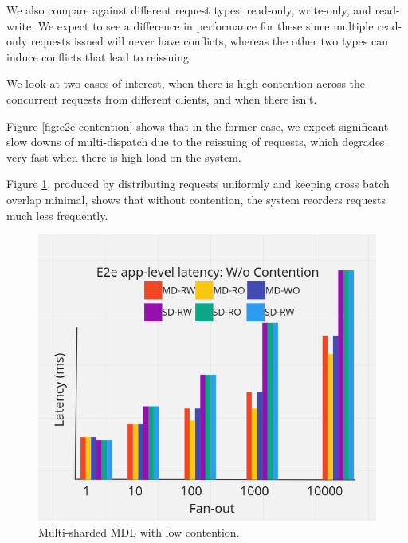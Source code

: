 We also compare against different request types: read-only, write-only, and read-write. We expect to see a difference in performance for these since multiple read-only requests issued will never have conflicts, whereas the other two types can induce conflicts that lead to reissuing.

We look at two cases of interest, when there is high contention across the concurrent requests from different clients, and when there isn't. 

Figure \ref{fig:e2e-contention} shows that in the former case, we expect significant slow downs of multi-dispatch due to the reissuing of requests, which degrades very fast when there is high load on the system.

Figure \ref{fig:e2e-nocontention}, produced by distributing requests uniformly and keeping cross batch overlap minimal, shows that without contention, the system reorders requests much less frequently.
\begin{figure}[!htb]
\includegraphics[scale=.32]{e2e-wo-contention.png}
\caption{Multi-sharded MDL with low contention.}
\label{fig:e2e-nocontention}
\end{figure}

